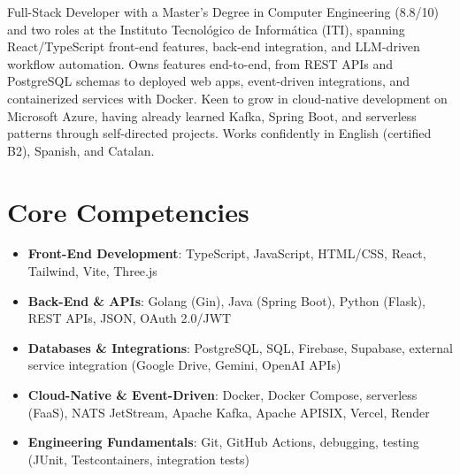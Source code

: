 \documentclass[11pt,a4paper,sans]{moderncv}
\begin{document}
\makecvtitle


\vspace{6pt}
\small{Full-Stack Developer with a Master's Degree in Computer Engineering (8.8/10) and two roles at the Instituto Tecnológico de Informática (ITI), spanning React/TypeScript front-end features, back-end integration, and LLM-driven workflow automation. Owns features end-to-end, from REST APIs and PostgreSQL schemas to deployed web apps, event-driven integrations, and containerized services with Docker. Keen to grow in cloud-native development on Microsoft Azure, having already learned Kafka, Spring Boot, and serverless patterns through self-directed projects. Works confidently in English (certified B2), Spanish, and Catalan.}


\section{Core Competencies}
\vspace{1pt}
\begin{itemize}

\item \textbf{Front-End Development}: TypeScript, JavaScript, HTML/CSS, React, Tailwind, Vite, Three.js

\item \textbf{Back-End \& APIs}: Golang (Gin), Java (Spring Boot), Python (Flask), REST APIs, JSON, OAuth 2.0/JWT

\item \textbf{Databases \& Integrations}: PostgreSQL, SQL, Firebase, Supabase, external service integration (Google Drive, Gemini, OpenAI APIs)

\item \textbf{Cloud-Native \& Event-Driven}: Docker, Docker Compose, serverless (FaaS), NATS JetStream, Apache Kafka, Apache APISIX, Vercel, Render

\item \textbf{Engineering Fundamentals}: Git, GitHub Actions, debugging, testing (JUnit, Testcontainers, integration tests)

\end{itemize}
\end{document}
